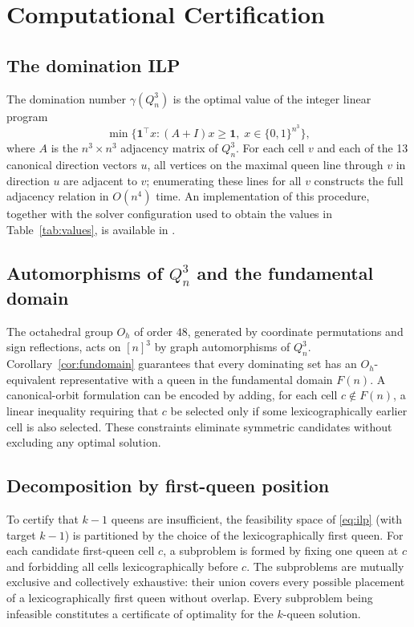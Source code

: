 \documentclass[11pt]{article}
\begin{document}
\section{Computational Certification}
\label{sec:computation}

\subsection{The domination ILP}

The domination number $\gamma(Q^3_n)$ is the optimal value of the integer linear
program
\begin{equation}
\label{eq:ilp}
  \min\bigl\{\mathbf{1}^\top x : (A+I)x \geq \mathbf{1},\;
  x \in \{0,1\}^{n^3}\bigr\},
\end{equation}
where $A$ is the $n^3 \times n^3$ adjacency matrix of $Q^3_n$. For each cell $v$
and each of the 13 canonical direction vectors $u$, all vertices on the maximal
queen line through $v$ in direction $u$ are adjacent to $v$; enumerating these
lines for all $v$ constructs the full adjacency relation in $O(n^4)$ time.
An implementation of this procedure, together with the solver configuration used
to obtain the values in Table~\ref{tab:values}, is available in \cite{code}.

\subsection{Automorphisms of $Q^3_n$ and the fundamental domain}

The octahedral group $O_h$ of order $48$, generated by coordinate permutations
and sign reflections, acts on $[n]^3$ by graph automorphisms of $Q^3_n$.
Corollary~\ref{cor:fundomain} guarantees that every dominating set has an
$O_h$-equivalent representative with a queen in the fundamental domain $F(n)$.
A canonical-orbit formulation can be encoded by adding, for each cell
$c \notin F(n)$, a linear inequality requiring that $c$ be selected only if some
lexicographically earlier cell is also selected. These constraints eliminate
symmetric candidates without excluding any optimal solution.

\subsection{Decomposition by first-queen position}

To certify that $k-1$ queens are insufficient, the feasibility space of
\eqref{eq:ilp} (with target $k-1$) is partitioned by the choice of the
lexicographically first queen. For each candidate first-queen cell $c$, a
subproblem is formed by fixing one queen at $c$ and forbidding all cells
lexicographically before $c$. The subproblems are mutually exclusive and
collectively exhaustive: their union covers every possible placement of a
lexicographically first queen without overlap. Every subproblem being infeasible
constitutes a certificate of optimality for the $k$-queen solution.
\end{document}
